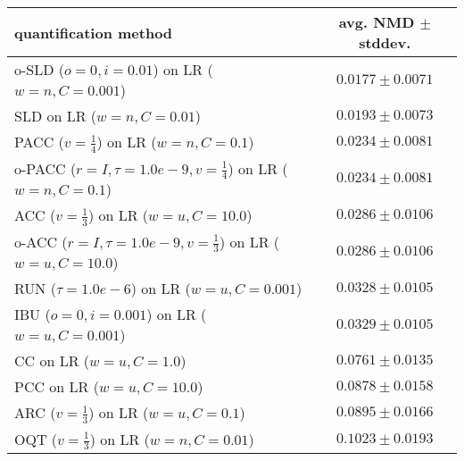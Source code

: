 \begin{tabular}{lc}
  \toprule
  quantification method & avg. NMD $\pm$ stddev. \\
  \midrule
  o-SLD ($o=0, i=0.01$) on LR ($w=n, C=0.001$) & $\mathbf{0.0177 \pm 0.0071}$ \\
  SLD on LR ($w=n, C=0.01$) & $0.0193 \pm 0.0073$ \\
  PACC ($v=\frac{1}{4}$) on LR ($w=n, C=0.1$) & $0.0234 \pm 0.0081$ \\
  o-PACC ($r=I, \tau=1.0e-9, v=\frac{1}{4}$) on LR ($w=n, C=0.1$) & $0.0234 \pm 0.0081$ \\
  ACC ($v=\frac{1}{3}$) on LR ($w=u, C=10.0$) & $0.0286 \pm 0.0106$ \\
  o-ACC ($r=I, \tau=1.0e-9, v=\frac{1}{3}$) on LR ($w=u, C=10.0$) & $0.0286 \pm 0.0106$ \\
  RUN ($\tau=1.0e-6$) on LR ($w=u, C=0.001$) & $0.0328 \pm 0.0105$ \\
  IBU ($o=0, i=0.001$) on LR ($w=u, C=0.001$) & $0.0329 \pm 0.0105$ \\
  CC on LR ($w=u, C=1.0$) & $0.0761 \pm 0.0135$ \\
  PCC on LR ($w=u, C=10.0$) & $0.0878 \pm 0.0158$ \\
  ARC ($v=\frac{1}{3}$) on LR ($w=u, C=0.1$) & $0.0895 \pm 0.0166$ \\
  OQT ($v=\frac{1}{3}$) on LR ($w=n, C=0.01$) & $0.1023 \pm 0.0193$ \\
  \bottomrule
\end{tabular}
